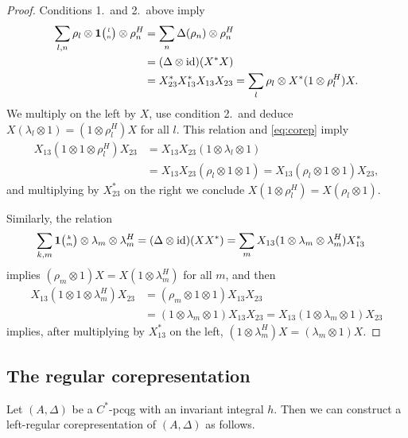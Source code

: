 \documentclass[11pt]{article}
\DeclareMathOperator{\id}{id}
\newcommand{\Grt}[3]{#1{\tiny {\begin{pmatrix} #2\\#3\end{pmatrix}}}}
\newcommand{\UnitC}[2]{\Grt{\mathbf{1}}{#1}{#2}}
\theoremstyle{definition}
\numberwithin{equation}{section}
\begin{document}
\begin{proof}
  Conditions 1.\ and 2.\ above imply
  \begin{align*}
 \sum_{l,n} \rho_{l} \otimes
  \UnitC{l}{n} \otimes \rho_{n}^{H} &=
    \sum_{n} \Delta(\rho_{n}) \otimes \rho_{n}^{H} \\ &= (\Delta \otimes
    \id)(X^{*}X) \\ &= X^{*}_{23}X^{*}_{13}X_{13}X_{23}  =
    \sum_{l}\rho_{l} \otimes X^{*}(1 \otimes \rho_{l}^{H})X.
  \end{align*}
  We multiply on the left by $X$, use  condition 2.\, and deduce
  $X(\lambda_{l}\otimes 1)=(1\otimes \rho_{l}^{H})X$ for all $l$.
  This relation and \eqref{eq:corep} imply
 \begin{align*}
   X_{13}(1\otimes 1 \otimes \rho_{l}^{H})X_{23} &=X_{13}X_{23}(1
   \otimes \lambda_{l} \otimes 1) \\ &= X_{13}X_{23}(\rho_{l} \otimes 1
   \otimes 1) = X_{13} (\rho_{l} \otimes 1
   \otimes 1) X_{23},
 \end{align*}
 and multiplying by $X_{23}^{*}$ on the right we conclude $X(1\otimes
 \rho^{H}_{l})=X(\rho_{l} \otimes 1)$.


  Similarly,  the relation
  \begin{align*}
    \sum_{k,m} \UnitC{k}{m} \otimes \lambda_{m} \otimes
    \lambda_{m}^{H} &= (\Delta \otimes \id)(XX^{*}) = \sum_{m}
    X_{13}(1 \otimes \lambda_{m} \otimes \lambda_{m}^{H})X_{13}^{*}
  \end{align*}
  implies $(\rho_{m} \otimes 1)X=X(1\otimes \lambda^{H}_{m})$ for all
  $m$, and then
  \begin{align*}
    X_{13}(1 \otimes 1 \otimes \lambda^{H}_{m})X_{23} &= (
    \rho_{m} \otimes 1 \otimes 1)X_{13}X_{23} \\ &= (1\otimes
    \lambda_{m}\otimes 1)X_{13}X_{23} = X_{13}(1 \otimes \lambda_{m}
    \otimes 1)X_{23}
  \end{align*}
  implies, after multiplying by $X_{13}^{*}$ on the left, $(1 \otimes
  \lambda_{m}^{H})X=(\lambda_{m} \otimes 1)X$.
\end{proof}

\subsection{The regular corepresentation}
 Let $(A,\Delta)$ be a $C^{*}$-pcqg with an invariant integral $h$. 
 Then we can construct a left-regular corepresentation of $(A,\Delta)$ as follows.
\end{document}
